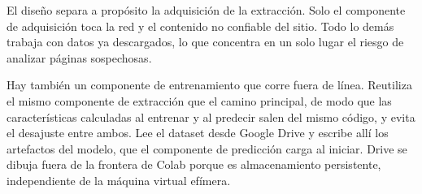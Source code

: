 El diseño separa a propósito la adquisición de la extracción. Solo el componente de adquisición toca la red y el contenido no confiable del sitio. Todo lo demás trabaja con datos ya descargados, lo que concentra en un solo lugar el riesgo de analizar páginas sospechosas. \newline

Hay también un componente de entrenamiento que corre fuera de línea. Reutiliza el mismo componente de extracción que el camino principal, de modo que las características calculadas al entrenar y al predecir salen del mismo código, y evita el desajuste entre ambos. Lee el dataset desde Google Drive y escribe allí los artefactos del modelo, que el componente de predicción carga al iniciar. Drive se dibuja fuera de la frontera de Colab porque es almacenamiento persistente, independiente de la máquina virtual efímera.
\newline


